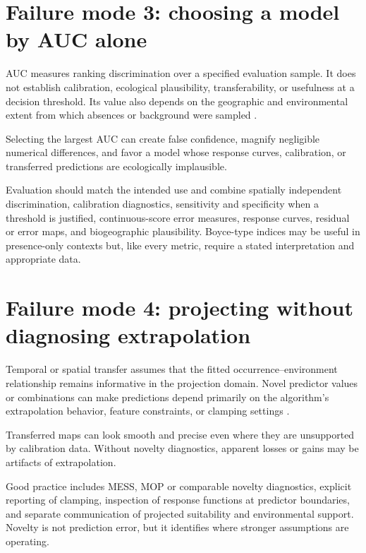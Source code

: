 \section{Failure mode 3: choosing a model by AUC alone}

AUC measures ranking discrimination over a specified evaluation sample. It does not establish calibration, ecological plausibility, transferability, or usefulness at a decision threshold. Its value also depends on the geographic and environmental extent from which absences or background were sampled \parencite{lobo2008auc,allouche2006assessing}.

\begin{sdmwarningbox}
Selecting the largest AUC can create false confidence, magnify negligible numerical differences, and favor a model whose response curves, calibration, or transferred predictions are ecologically implausible.
\end{sdmwarningbox}

Evaluation should match the intended use and combine spatially independent discrimination, calibration diagnostics, sensitivity and specificity when a threshold is justified, continuous-score error measures, response curves, residual or error maps, and biogeographic plausibility. Boyce-type indices may be useful in presence-only contexts but, like every metric, require a stated interpretation and appropriate data.

\section{Failure mode 4: projecting without diagnosing extrapolation}

Temporal or spatial transfer assumes that the fitted occurrence--environment relationship remains informative in the projection domain. Novel predictor values or combinations can make predictions depend primarily on the algorithm's extrapolation behavior, feature constraints, or clamping settings \parencite{elith2010functional,owens2013constraints,zurell2020standard}.

\begin{sdmwarningbox}
Transferred maps can look smooth and precise even where they are unsupported by calibration data. Without novelty diagnostics, apparent losses or gains may be artifacts of extrapolation.
\end{sdmwarningbox}

Good practice includes MESS, MOP or comparable novelty diagnostics, explicit reporting of clamping, inspection of response functions at predictor boundaries, and separate communication of projected suitability and environmental support. Novelty is not prediction error, but it identifies where stronger assumptions are operating.


